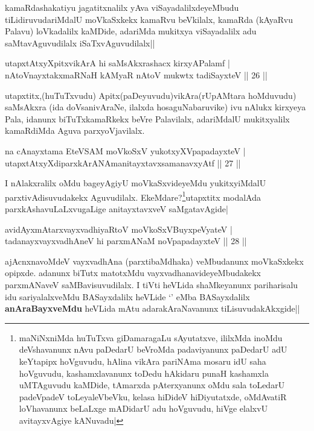 \begin{artha}
kamaRdashakatiyu jagatitxnalilx yAva viSayadalilxdeyeMbudu tiLidiruvudariMdalU moVkaSxkekx kamaRvu beVkilalx, kamaRda (kAyaRvu Palavu) loVkadalilx kaMDide, adariMda mukitxya viSayadalilx adu saMtavAguvudilalx iSaTxvAguvudilalx||
\end{artha}


\begin{shl}
utapxtAtxyXpitxvikArA hi saMsAkxrashacx kirxyAPalamf |\\
nAtoV\s nayxtakxmaRNaH kAMyaR nAtoV mukwtx tadiSayxteV \hfill || 26 ||
\end{shl}

\begin{artha}
utapxtitx,(huTuTxvudu) Apitx(paDeyuvudu)vikAra(rUpAMtara hoMduvudu) saMsAkxra (ida doVsanivAraNe, ilalxda hosaguNabaruvike) ivu nAlukx kirxyeya Pala, idanunx biTuTxkamaRkekx beVre Palavilalx, adariMdalU mukitxyalilx kamaRdiMda Aguva parxyoVjavilalx.
\end{artha}

\begin{shl}
na cAnayxtama EteVSAM moVkoSxV yukotxyXVpapadayxteV |\\
utapxtAtxyXdiparxkArANAmanitayxtavxsamanavxyAtf \hfill ||  27 ||
\end{shl}

\begin{artha}
I nAlakxralilx oMdu bageyAgiyU moVkaSxvideyeMdu yukitxyiMdalU parxtivAdisuvudakekx Aguvudilalx. EkeMdare?\footnote{maNiNxniMda huTuTxva giDamaragaLu sAyutatxve, ililxMda inoMdu deVshavanunx nAvu paDedarU beVroMda padaviyanunx paDedarU adU keYtapipx hoVguvudu, hAlina vikAra pariNAma mosaru idU saha hoVguvudu, kashamxlavanunx toDedu hAkidaru punaH kashamxla uMTAguvudu kaMDide, tAmarxda pAterxyanunx oMdu sala toLedarU padeVpadeV toLeyaleVbeVku, kelasa hiDideV hiDiyutatxde, oMdAvatiR loVhavanunx beLaLxge mADidarU adu hoVguvudu, hiVge elalxvU avitayxvAgiye kANuvadu|}utapxtitx modalAda parxkAshavuLaLxvugaLige anitayxtavxveV saMgatavAgide|
\end{artha}

\begin{shl}
avidAyxmAtarxvayxvadhiyaRtoV moVkoSxV\s BuyxpeVyateV |\\
tadanayxvayxvadhAneV hi parxmANaM noVpapadayxteV \hfill || 28 ||
\end{shl}

\begin{artha}
ajAcnxnavoMdeV vayxvadhAna (parxtibaMdhaka) veMbudanunx moVkaSxkekx opipxde. adanunx biTutx matotxMdu vayxvadhanavideyeMbudakekx parxmANaveV saMBavisuvudilalx. I tiVti heVLida shaMkeyanunx pariharisalu idu sariyalalxveMdu BASayxdalilx heVLide `\stext' eMba BASayxdalilx \textbf{anAraBayxveMdu} heVLida mAtu adarakAraNavanunx tiLisuvudakAkxgide||
\end{artha}


